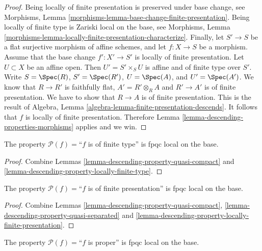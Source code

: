 \begin{proof}
Being locally of finite presentation is preserved under base change, see
Morphisms, Lemma \ref{morphisms-lemma-base-change-finite-presentation}.
Being locally of finite type is Zariski local on the base, see Morphisms,
Lemma \ref{morphisms-lemma-locally-finite-presentation-characterize}.
Finally, let
$S' \to S$ be a flat surjective morphism of affine schemes,
and let $f : X \to S$ be a morphism. Assume that the base change
$f' : X' \to S'$ is locally of finite presentation.
Let $U \subset X$ be an affine open. Then $U' = S' \times_S U$
is affine and of finite type over $S'$. Write
$S = \Spec(R)$,
$S' = \Spec(R')$,
$U = \Spec(A)$, and
$U' = \Spec(A')$.
We know that $R \to R'$ is faithfully flat,
$A' = R' \otimes_R A$ and $R' \to A'$ is of finite presentation.
We have to show that $R \to A$ is of finite presentation.
This is the result of
Algebra, Lemma \ref{algebra-lemma-finite-presentation-descends}.
It follows that $f$ is locally of finite presentation.
Therefore Lemma \ref{lemma-descending-properties-morphisms} applies and we win.
\end{proof}

\begin{lemma}
\label{lemma-descending-property-finite-type}
The property $\mathcal{P}(f) =$``$f$ is of finite type''
is fpqc local on the base.
\end{lemma}

\begin{proof}
Combine Lemmas \ref{lemma-descending-property-quasi-compact}
and \ref{lemma-descending-property-locally-finite-type}.
\end{proof}

\begin{lemma}
\label{lemma-descending-property-finite-presentation}
The property $\mathcal{P}(f) =$``$f$ is of finite presentation''
is fpqc local on the base.
\end{lemma}

\begin{proof}
Combine Lemmas \ref{lemma-descending-property-quasi-compact},
\ref{lemma-descending-property-quasi-separated} and
\ref{lemma-descending-property-locally-finite-presentation}.
\end{proof}

\begin{lemma}
\label{lemma-descending-property-proper}
The property $\mathcal{P}(f) =$``$f$ is proper''
is fpqc local on the base.
\end{lemma}

